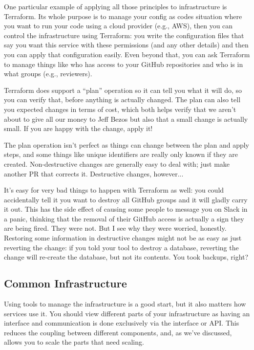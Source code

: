 \documentclass[a4paper]{report}
\begin{document}
One particular example of applying all those principles to infrastructure
is Terraform. Its whole purpose is to manage your config as codes
situation where you want to run your code using a cloud provider (e.g., AWS), 
then you can control the infrastructure using Terraform: you write the
configuration files that say you want this service with these permissions
(and any other details) and then you can apply that configuration easily. 
Even beyond that, you can ask Terraform to manage things like who has access
to your GitHub repositories and who is in what groups (e.g., reviewers).

Terraform does support a ``plan'' operation so it can tell you what it will
do, so you can verify that, before anything is actually changed. The plan can also tell you expected changes in terms of cost, which both helps verify that we aren't about to give all our money to Jeff Bezos but also that a small change is actually small. If you are happy with the change, apply it! 

The plan operation isn't perfect as things can change between the plan and apply steps, and some things like unique identifiers are really only known if they are created. Non-destructive changes are generally easy to deal with; just make another PR that corrects it. Destructive changes, however...

It's easy for very bad things to happen with Terraform as well: you could accidentally tell it you want to destroy all GitHub groups and it will gladly carry it out. This has the side effect of causing some people to message you on Slack in a panic, thinking that the removal of their GitHub access is actually a sign they are being fired. They were not. But I see why they were worried, honestly. Restoring some information in destructive changes might not be as easy as just reverting the change: if you told your tool to destroy a database, reverting the change will re-create the database, but not its contents. You took backups, right?

\subsection*{Common Infrastructure}
Using tools to manage the infrastructure is a good start, but it also matters how services use it. You should view different parts of your infrastructure as having an interface and communication is done exclusively via the interface or API. This reduces the coupling between different components, and, as we've discussed, allows you to scale the parts that need scaling. 
\end{document}

